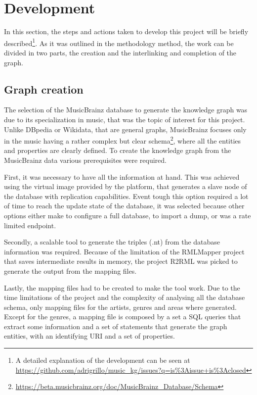 \section{Development}
In this section, the steps and actions taken to develop this project will be briefly described\footnote{A detailed explanation of the development can be seen at \url{https://github.com/adrigrillo/music_kg/issues?q=is\%3Aissue+is\%3Aclosed}}.
As it was outlined in the methodology method, the work can be divided in two parts, the creation and the interlinking and completion of the graph.

\subsection{Graph creation}
The selection of the MusicBrainz database to generate the knowledge graph was due to its specialization in music, that was the topic of interest for this project.
Unlike DBpedia or Wikidata, that are general graphs, MusicBrainz focuses only in the music having a rather complex but clear schema\footnote{\url{https://beta.musicbrainz.org/doc/MusicBrainz_Database/Schema}}, where all the entities and properties are clearly defined.
To create the knowledge graph from the MusicBrainz data various prerequisites were required.

First, it was necessary to have all the information at hand.
This was achieved using the virtual image provided by the platform, that generates a slave node of the database with replication capabilities.
Event tough this option required a lot of time to reach the update state of the database, it was selected because other options either make to configure a full database, to import a dump, or was a rate limited endpoint.

Secondly, a scalable tool to generate the triples (.nt) from the database information was required.
Because of the limitation of the RMLMapper \citep{rmlmapper} project that saves intermediate results in memory, the project R2RML was picked to generate the output from the mapping files. 

Lastly, the mapping files had to be created to make the tool work.
Due to the time limitations of the project and the complexity of analysing all the database schema, only mapping files for the artists, genres and areas where generated.
Except for the genres, a mapping file is composed by a set a SQL queries that extract some information and a set of statements that generate the graph entities, with an identifying URI and a set of properties.

